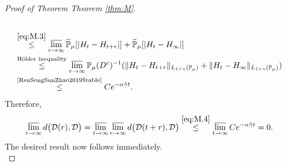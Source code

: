 \documentclass[12pt,a4paper]{amsart}
\theoremstyle{plain}
\theoremstyle{definition}
\numberwithin{equation}{section}
\begin{document}
\begin{proof}[Proof of Theorem Theorem \ref{thm:M}]
\begin{align}
\\&\overset{\eqref{eq:M.3}}\leq \varlimsup_{r\rightarrow \infty}\widetilde{\mathbb P}_{\mu}[|H_t - H_{t+r}|]+\widetilde{\mathbb P}_{\mu}[|H_t-H_{\infty}|]
 \\&\overset{\text{H\"older inequality}}\leq \varlimsup_{r\rightarrow \infty}\mathbb P_{\mu}(D^c)^{-1}(\|H_t-H_{t+r}\|_{L_{1+\gamma} (\mathbb P_\mu)}+\|H_t-H_{\infty}\|_{L_{1+\gamma} (\mathbb P_\mu)})
\\&\label{eq:M.4}\overset{\text{\cite[Lemma 3.3]{RenSongSunZhao2019Stable}}}\leq C e^{-\alpha \tilde \gamma t}.
\end{align}
Therefore, 
\begin{align}
 &\varlimsup_{r\rightarrow \infty}d\big(\mathcal D(r),\mathcal D\big)
 =\varlimsup_{t\to \infty}\varlimsup_{r\rightarrow \infty}d\big(\mathcal D(t+r),\mathcal D\big)
\overset{\eqref{eq:M.4}}\leq \varlimsup_{t\rightarrow \infty}Ce^{-\alpha \tilde \gamma t} = 0.
\end{align}
The desired result now follows immediately.
\\

\end{proof}
\end{document}
